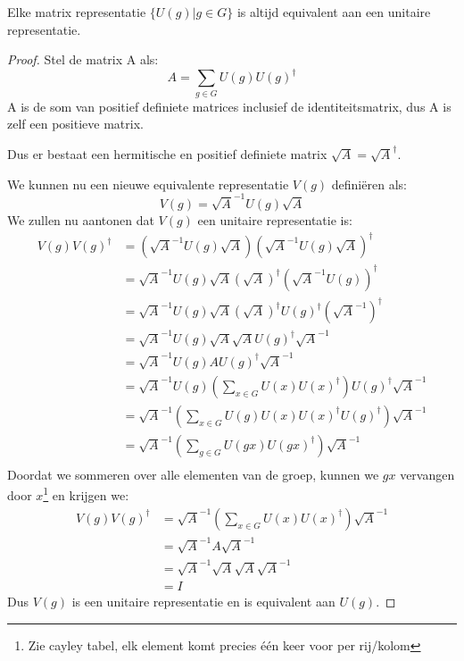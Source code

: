 \begin{theorem}
    Elke matrix representatie \(\{U(g)|g\in G\}\) is altijd equivalent aan een unitaire representatie.
\end{theorem}
\begin{proof}
    Stel de matrix A als:
    \[A = \sum_{g\in G} U(g) U(g)^{\dagger}\]
    A is de som van positief definiete matrices inclusief de identiteitsmatrix,
    dus A is zelf een positieve matrix.

    Dus er bestaat een hermitische en positief definiete matrix \(\sqrt{A} = \sqrt{A}^\dagger\).

    We kunnen nu een nieuwe equivalente representatie \(V(g)\) definiëren als:
    \[
    V(g) = \sqrt{A}^{-1} U(g) \sqrt{A}
    \]
    We zullen nu aantonen dat \(V(g)\) een unitaire representatie is:
    \begin{align*}
    V(g)V(g)^{\dagger} &= \left(\sqrt{A}^{-1} U(g) \sqrt{A}\right) \left(\sqrt{A}^{-1} U(g) \sqrt{A}\right)^{\dagger} \\
    &= \sqrt{A}^{-1} U(g) \sqrt{A} \left(\sqrt{A}\right)^{\dagger} \left(\sqrt{A}^{-1} U(g)\right)^{\dagger} \\
    &= \sqrt{A}^{-1} U(g) \sqrt{A}  \left(\sqrt{A}\right)^{\dagger} U(g)^{\dagger} \left(\sqrt{A}^{-1}\right)^{\dagger} \\
    &= \sqrt{A}^{-1} U(g) \sqrt{A}  \sqrt{A}  U(g)^{\dagger}  \sqrt{A}^{-1} \\
    &= \sqrt{A}^{-1} U(g) A U(g)^{\dagger} \sqrt{A}^{-1} \\
    &= \sqrt{A}^{-1} U(g) \left(\sum_{x\in G} U(x) U(x)^{\dagger}\right) U(g)^{\dagger} \sqrt{A}^{-1} \\
    &= \sqrt{A}^{-1} \left(\sum_{x\in G} U(g)U(x)U(x)^{\dagger} U(g)^{\dagger}\right) \sqrt{A}^{-1} \\
    &= \sqrt{A}^{-1} \left(\sum_{g\in G} U(gx) U(gx)^{\dagger}\right) \sqrt{A}^{-1} \\
    \end{align*}
    Doordat we sommeren over alle elementen van de groep, kunnen we \(gx\) vervangen door \(x\)\footnote{Zie cayley tabel, elk element komt precies één keer voor per rij/kolom} en krijgen we:
    \begin{align*}
    V(g)V(g)^{\dagger} &= \sqrt{A}^{-1} \left(\sum_{x\in G} U(x) U(x)^{\dagger}\right) \sqrt{A}^{-1} \\
    &= \sqrt{A}^{-1} A \sqrt{A}^{-1} \\
    &= \sqrt{A}^{-1} \sqrt{A}\sqrt{A} \sqrt{A}^{-1} \\
    &= I
    \end{align*}
    Dus \(V(g)\) is een unitaire representatie en is equivalent aan \(U(g)\).
\end{proof}
